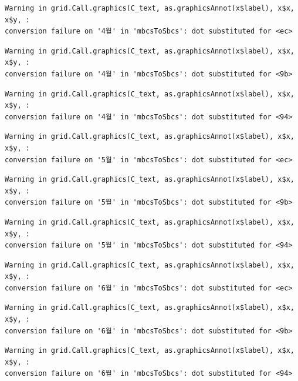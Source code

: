 \documentclass[
  letterpaper,
  DIV=11,
  numbers=noendperiod]{scrreprt}
\begin{document}
\begin{verbatim}
Warning in grid.Call.graphics(C_text, as.graphicsAnnot(x$label), x$x, x$y, :
conversion failure on '4월' in 'mbcsToSbcs': dot substituted for <ec>
\end{verbatim}

\begin{verbatim}
Warning in grid.Call.graphics(C_text, as.graphicsAnnot(x$label), x$x, x$y, :
conversion failure on '4월' in 'mbcsToSbcs': dot substituted for <9b>
\end{verbatim}

\begin{verbatim}
Warning in grid.Call.graphics(C_text, as.graphicsAnnot(x$label), x$x, x$y, :
conversion failure on '4월' in 'mbcsToSbcs': dot substituted for <94>
\end{verbatim}

\begin{verbatim}
Warning in grid.Call.graphics(C_text, as.graphicsAnnot(x$label), x$x, x$y, :
conversion failure on '5월' in 'mbcsToSbcs': dot substituted for <ec>
\end{verbatim}

\begin{verbatim}
Warning in grid.Call.graphics(C_text, as.graphicsAnnot(x$label), x$x, x$y, :
conversion failure on '5월' in 'mbcsToSbcs': dot substituted for <9b>
\end{verbatim}

\begin{verbatim}
Warning in grid.Call.graphics(C_text, as.graphicsAnnot(x$label), x$x, x$y, :
conversion failure on '5월' in 'mbcsToSbcs': dot substituted for <94>
\end{verbatim}

\begin{verbatim}
Warning in grid.Call.graphics(C_text, as.graphicsAnnot(x$label), x$x, x$y, :
conversion failure on '6월' in 'mbcsToSbcs': dot substituted for <ec>
\end{verbatim}

\begin{verbatim}
Warning in grid.Call.graphics(C_text, as.graphicsAnnot(x$label), x$x, x$y, :
conversion failure on '6월' in 'mbcsToSbcs': dot substituted for <9b>
\end{verbatim}

\begin{verbatim}
Warning in grid.Call.graphics(C_text, as.graphicsAnnot(x$label), x$x, x$y, :
conversion failure on '6월' in 'mbcsToSbcs': dot substituted for <94>
\end{verbatim}
\end{document}
